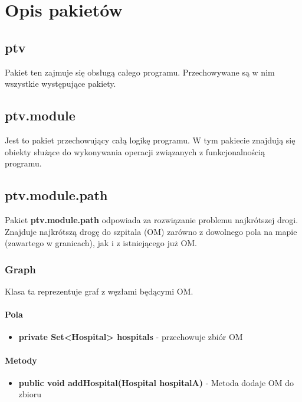 \documentclass[]{article}
\begin{document}
    
    \section{Opis pakietów}
        \subsection{ptv}
        Pakiet ten zajmuje się obsługą całego programu. Przechowywane są w nim wszystkie występujące pakiety.
        \subsection{ptv.module}
        Jest to pakiet przechowujący całą logikę programu. W tym pakiecie znajdują się obiekty służące do 
        wykonywania operacji związanych z funkcjonalnością programu.
        \subsection{ptv.module.path} %
        Pakiet \textbf{ptv.module.path} odpowiada za rozwiązanie problemu najkrótszej drogi. 
        Znajduje najkrótszą drogę do szpitala (OM) zarówno z dowolnego pola na mapie (zawartego w granicach), 
        jak i z istniejącego już OM. 
                    
    \subsubsection{Graph}
            Klasa ta reprezentuje graf z węzłami będącymi OM.
                
                \paragraph{Pola}
                    \begin{itemize}
                        \item \textbf{private Set<Hospital> hospitals} - przechowuje zbiór OM
                    \end{itemize}
            
                \paragraph{Metody}
                    \begin{itemize}
                        \item \textbf{public void addHospital(Hospital hospitalA)} - Metoda dodaje OM do zbioru 
                    \end{itemize}
                
\end{document}
